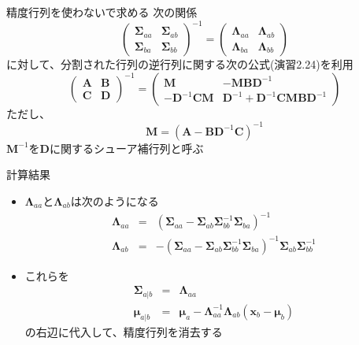 \begin{frame}{精度行列を使わないで求める}
 次の関係
 \begin{equation}
  \begin{pmatrix}
   \bm{\Sigma}_{aa} & \bm{\Sigma}_{ab}  \\
   \bm{\Sigma}_{ba} & \bm{\Sigma}_{bb}
  \end{pmatrix}^{-1}=
  \begin{pmatrix}
   \bm{\Lambda}_{aa} & \bm{\Lambda}_{ab}  \\
   \bm{\Lambda}_{ba} & \bm{\Lambda}_{bb}
  \end{pmatrix}
 \end{equation}
 に対して、分割された行列の逆行列に関する次の公式(演習2.24)を利用
 \begin{equation}
  \begin{pmatrix}
   \bm{A} & \bm{B} \\
   \bm{C} & \bm{D}
  \end{pmatrix}^{-1}
  =
  \begin{pmatrix}
   \bm{M} & -\bm{M}\bm{B}\bm{D}^{-1} \\
   -\bm{D}^{-1}\bm{C}\bm{M} & \bm{D}^{-1}+\bm{D}^{-1}\bm{C}\bm{M}\bm{B}\bm{D}^{-1}
  \end{pmatrix}\label{053319_21Nov14}
 \end{equation}
 ただし、
 \begin{equation}
  \bm{M}=(\bm{A}-\bm{B}\bm{D}^{-1}\bm{C})^{-1}
 \end{equation}
 $\bm{M}^{-1}$を$\bm{D}$に関するシューア補行列と呼ぶ
\end{frame}

\begin{frame}{計算結果}
 \begin{itemize}
  \item $\bm{\Lambda}_{aa}$と$\bm{\Lambda}_{ab}$は次のようになる
        \begin{eqnarray}
         \bm{\Lambda}_{aa}&=&(\bm{\Sigma}_{aa}-\bm{\Sigma}_{ab}\bm{\Sigma}_{bb}^{-1}\bm{\Sigma}_{ba})^{-1} \\
         \bm{\Lambda}_{ab}&= &-(\bm{\Sigma}_{aa}-\bm{\Sigma}_{ab}\bm{\Sigma}_{bb}^{-1}\bm{\Sigma}_{ba})^{-1} \bm{\Sigma}_{ab}\bm{\Sigma}_{bb}^{-1}
        \end{eqnarray}
  \item これらを
        \begin{eqnarray}
         \bm{\Sigma}_{a|b} &=& \bm{\Lambda}_{aa} \\
         \bm{\mu}_{a|b}  &= & \bm{\mu}_a - \bm{\Lambda}_{aa}^{-1}\bm{\Lambda}_{ab}(\bm{x}_b-\bm{\mu}_b)
        \end{eqnarray}
        の右辺に代入して、精度行列を消去する
 \end{itemize}
\end{frame}

